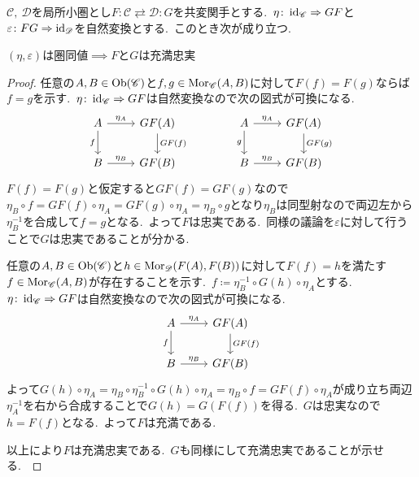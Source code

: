 \begin{proposition}
$\mathscr{C},\ \mathscr{D}$を局所小圏とし$F \colon \mathscr{C} \rightleftarrows \mathscr{D} \colon G$を共変関手とする.\
$\eta \colon \operatorname{id}_{\mathscr{C}} \Rightarrow GF$と$\varepsilon \colon FG \Rightarrow \operatorname{id}_{\mathscr{D}}$を自然変換とする.\
このとき次が成り立つ.
\begin{center}
$(\eta, \varepsilon)$は圏同値$\implies$$F$と$G$は充満忠実
\end{center}
\end{proposition}

\begin{proof}
任意の$A,B \in \operatorname{Ob}(\mathscr{C})$と$f,g \in \operatorname{Mor}_{\mathscr{C}}(A,B)$に対して$F(f) = F(g)$ならば$f = g$を示す.\
$\eta \colon \operatorname{id}_{\mathscr{C}} \Rightarrow GF$は自然変換なので次の図式が可換になる.\
\[\begin{tikzcd}
	A & {GF(A)} && A & {GF(A)} \\
	B & {GF(B)} && B & {GF(B)}
	\arrow["{\eta_A}", from=1-1, to=1-2]
	\arrow["f"', from=1-1, to=2-1]
	\arrow["{GF(f)}", from=1-2, to=2-2]
	\arrow["{\eta_A}", from=1-4, to=1-5]
	\arrow["g"', from=1-4, to=2-4]
	\arrow["{GF(g)}", from=1-5, to=2-5]
	\arrow["{\eta_B}", from=2-1, to=2-2]
	\arrow["{\eta_B}", from=2-4, to=2-5]
\end{tikzcd}\]
$F(f) = F(g)$と仮定すると$GF(f) = GF(g)$なので$\eta_B \circ f = GF(f) \circ \eta_A = GF(g) \circ \eta_A = \eta_B \circ g$となり$\eta_B$は同型射なので両辺左から$\eta_B^{-1}$を合成して$f = g$となる.\
よって$F$は忠実である.\ 同様の議論を$\varepsilon$に対して行うことで$G$は忠実であることが分かる.\

任意の$A, B \in \operatorname{Ob}(\mathscr{C})$と$h \in \operatorname{Mor}_{\mathscr{D}}(F(A), F(B))$に対して$F(f) = h$を満たす$f \in \operatorname{Mor}_{\mathscr{C}}(A,B)$が存在することを示す.\
$f \coloneq \eta_B^{-1} \circ G(h) \circ \eta_A$とする.\
$\eta \colon \operatorname{id}_{\mathscr{C}} \Rightarrow GF$は自然変換なので次の図式が可換になる.\
\[\begin{tikzcd}
	A & {GF(A)} \\
	B & {GF(B)}
	\arrow["{\eta_A}", from=1-1, to=1-2]
	\arrow["f"', from=1-1, to=2-1]
	\arrow["{GF(f)}", from=1-2, to=2-2]
	\arrow["{\eta_B}", from=2-1, to=2-2]
\end{tikzcd}\]
よって$G(h) \circ \eta_A = \eta_B \circ \eta_B^{-1} \circ G(h) \circ \eta_A = \eta_B \circ f = GF(f) \circ \eta_A$が成り立ち両辺$\eta_A^{-1}$を右から合成することで$G(h) = G(F(f))$を得る.\
$G$は忠実なので$h = F(f)$となる.\
よって$F$は充満である.\

以上により$F$は充満忠実である.\ $G$も同様にして充満忠実であることが示せる.\

\end{proof}


